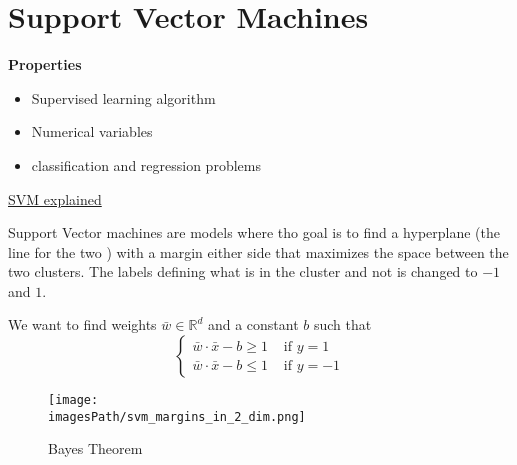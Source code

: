 

\newpage
\section{Support Vector Machines}
\textbf{Properties}
\begin{itemize}
    \item Supervised learning algorithm
    \item Numerical variables 
    \item classification and regression problems
\end{itemize}
\href{https://www.youtube.com/watch?v=efR1C6CvhmE}{SVM explained}

Support Vector machines are models where tho goal is to find a hyperplane (the line for the two ) with a 
margin either side that maximizes the space between the two clusters.
The labels defining what is in the cluster and not is changed to $-1$ and $1$.

We want to find weights $\bar{w} \in \mathbb{R}^d$ and a constant $b$ such that
\begin{equation*}
    \begin{cases}
        \bar{w} \cdot \bar{x} -b \geq 1 & \text{ if } y=1 \\
        \bar{w} \cdot \bar{x} -b \leq 1 & \text{ if } y=-1
    \end{cases}
\end{equation*}


\begin{figure}[!h]
    \centering
    \texttt{[image: \\imagesPath/svm\_margins\_in\_2\_dim.png]}
    \caption{Bayes Theorem}
\end{figure}


